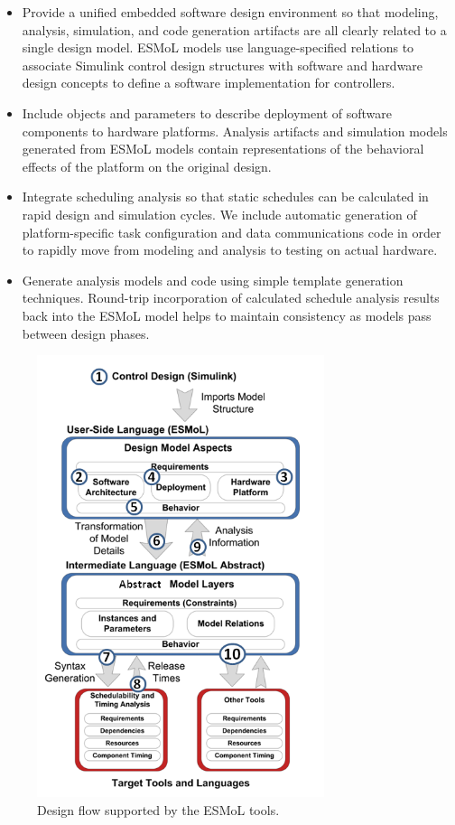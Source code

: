 \begin{itemize}

\item Provide a unified embedded software design environment 
so that modeling, analysis, 
simulation, and code generation artifacts are all 
clearly related to a single design model. ESMoL models use language-specified relations to associate Simulink 
control design structures with
software and hardware design concepts to define a
software implementation for controllers.

\item Include objects and parameters 
to describe deployment of software components to 
hardware platforms.  Analysis artifacts and simulation 
models generated from ESMoL models contain 
representations of the behavioral effects of the 
platform on the original design.

\item Integrate scheduling analysis
so that static schedules can be calculated in rapid design and
simulation cycles.  We include automatic generation of platform-specific
task configuration and data communications code in order to
rapidly move from modeling and analysis to testing on actual hardware.

\item Generate analysis models and code 
using simple template generation techniques.
Round-trip incorporation of calculated schedule 
analysis results back into the ESMoL model helps to
maintain consistency as models pass between design phases.

\end{itemize}

\begin{figure}[thpb]
\centering
\includegraphics[width=0.75\textwidth]{img/designflow.png}
\caption{Design flow supported by the ESMoL tools.}
\label{fig:designflow}
\end{figure}

